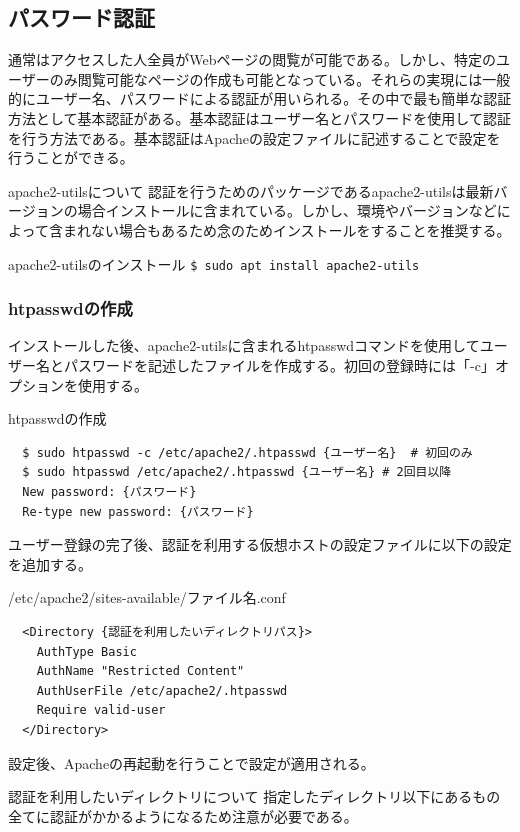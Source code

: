 \documentclass[a4paper, 11pt, dvipdfmx]{jsarticle}
\begin{document}
\subsection{パスワード認証}
通常はアクセスした人全員がWebページの閲覧が可能である。しかし、特定のユーザーのみ閲覧可能なページの作成も可能となっている。それらの実現には一般的にユーザー名、パスワードによる認証が用いられる。その中で最も簡単な認証方法として基本認証がある。基本認証はユーザー名とパスワードを使用して認証を行う方法である。基本認証はApacheの設定ファイルに記述することで設定を行うことができる。
\begin{hosokubox}{apache2-utilsについて}
  認証を行うためのパッケージであるapache2-utilsは最新バージョンの場合インストールに含まれている。しかし、環境やバージョンなどによって含まれない場合もあるため念のためインストールをすることを推奨する。
\end{hosokubox}
\begin{commandbox}{apache2-utilsのインストール}
  \verb|$ sudo apt install apache2-utils|
\end{commandbox}
\subsubsection{htpasswdの作成}
インストールした後、apache2-utilsに含まれるhtpasswdコマンドを使用してユーザー名とパスワードを記述したファイルを作成する。初回の登録時には「-c」オプションを使用する。
\begin{commandbox}{htpasswdの作成}
  \begin{verbatim}
  $ sudo htpasswd -c /etc/apache2/.htpasswd {ユーザー名}  # 初回のみ
  $ sudo htpasswd /etc/apache2/.htpasswd {ユーザー名} # 2回目以降
  New password: {パスワード}
  Re-type new password: {パスワード}\end{verbatim}
\end{commandbox}
ユーザー登録の完了後、認証を利用する仮想ホストの設定ファイルに以下の設定を追加する。
\begin{commandbox}{/etc/apache2/sites-available/{ファイル名}.conf}
  \begin{verbatim}
  <Directory {認証を利用したいディレクトリパス}>
    AuthType Basic
    AuthName "Restricted Content"
    AuthUserFile /etc/apache2/.htpasswd
    Require valid-user
  </Directory>\end{verbatim}
\end{commandbox}
設定後、Apacheの再起動を行うことで設定が適用される。
\begin{attentionbox}{認証を利用したいディレクトリについて}
  指定したディレクトリ以下にあるもの全てに認証がかかるようになるため注意が必要である。
\end{attentionbox}
\end{document}
